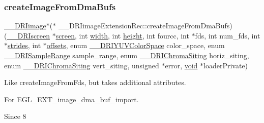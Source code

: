 \mbox{\label{struct_____d_r_iimage_extension_rec_a82ff9a5cf1d35bc7c3ee65320d049be6}} 
\subsubsection{\texorpdfstring{create\+Image\+From\+Dma\+Bufs}{createImageFromDmaBufs}}
{\footnotesize\ttfamily \hyperlink{dri__interface_8h_a37e0407153595dc88fe5d25127645cf1}{\+\_\+\+\_\+\+D\+R\+Iimage}$\ast$($\ast$ \+\_\+\+\_\+\+D\+R\+Iimage\+Extension\+Rec\+::create\+Image\+From\+Dma\+Bufs) (\hyperlink{dri__interface_8h_a9961b01d421ee1fd6ed3c05acc9ca561}{\+\_\+\+\_\+\+D\+R\+Iscreen} $\ast$\hyperlink{cad_8h_ae04e09e4e3831bfc1632c509ae37dcec}{screen}, int \hyperlink{gl_8h_a9a82cf3caff84cabc4598e2619faac17}{width}, int \hyperlink{gl_8h_aa352f2804b9902ac30769c00dde75d5f}{height}, int fourcc, int $\ast$fds, int num\+\_\+fds, int $\ast$\hyperlink{glcorearb_8h_abdc1551331dfc83183e1c34542207728}{strides}, int $\ast$\hyperlink{glcorearb_8h_a1b4d6c0d4a1eb8b693aa458f455ed705}{offsets}, enum \hyperlink{dri__interface_8h_a5afaea685809559659c2404ae006c2cd}{\+\_\+\+\_\+\+D\+R\+I\+Y\+U\+V\+Color\+Space} color\+\_\+space, enum \hyperlink{dri__interface_8h_a61a717b5248bb2b24994fa9854f774fc}{\+\_\+\+\_\+\+D\+R\+I\+Sample\+Range} sample\+\_\+range, enum \hyperlink{dri__interface_8h_a1624a92a3df1f832597cd6e6b908778c}{\+\_\+\+\_\+\+D\+R\+I\+Chroma\+Siting} horiz\+\_\+siting, enum \hyperlink{dri__interface_8h_a1624a92a3df1f832597cd6e6b908778c}{\+\_\+\+\_\+\+D\+R\+I\+Chroma\+Siting} vert\+\_\+siting, unsigned $\ast$error, \hyperlink{_s_d_l__opengles2__gl2ext_8h_ae5d8fa23ad07c48bb609509eae494c95}{void} $\ast$loader\+Private)}

Like create\+Image\+From\+Fds, but takes additional attributes.

For E\+G\+L\+\_\+\+E\+X\+T\+\_\+image\+\_\+dma\+\_\+buf\+\_\+import.

\begin{DoxySince}{Since}
8 
\end{DoxySince}
\mbox{\label{struct_____d_r_iimage_extension_rec_a182eb36ae38206c982a209e2a9579ba5}} 
